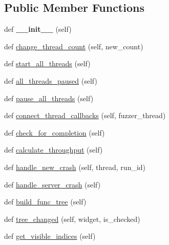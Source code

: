\subsection*{Public Member Functions}
\begin{DoxyCompactItemize}
\item 
\mbox{\label{classgui_1_1_main_window_a0d241e19e7e63710fec91439c752fd42}} 
def {\bfseries \+\_\+\+\_\+init\+\_\+\+\_\+} (self)
\item 
def \mbox{\hyperlink{classgui_1_1_main_window_a14e3103f94dde6b77a4a0b9303a0cd38}{change\+\_\+thread\+\_\+count}} (self, new\+\_\+count)
\item 
def \mbox{\hyperlink{classgui_1_1_main_window_a96d022201d286c60c202468c29379170}{start\+\_\+all\+\_\+threads}} (self)
\item 
def \mbox{\hyperlink{classgui_1_1_main_window_a9f26239fc8bef6253e4e08e16dd4d69b}{all\+\_\+threads\+\_\+paused}} (self)
\item 
def \mbox{\hyperlink{classgui_1_1_main_window_a09e1320955909d0a987d7846fa81107f}{pause\+\_\+all\+\_\+threads}} (self)
\item 
def \mbox{\hyperlink{classgui_1_1_main_window_ac32907b66ef6292c1b6e5f26d4a6baeb}{connect\+\_\+thread\+\_\+callbacks}} (self, fuzzer\+\_\+thread)
\item 
def \mbox{\hyperlink{classgui_1_1_main_window_aaad8f7c48ed82dc784928bb9ece116b3}{check\+\_\+for\+\_\+completion}} (self)
\item 
def \mbox{\hyperlink{classgui_1_1_main_window_a2a9cd1c91f12072f99ca7106b6345c0e}{calculate\+\_\+throughput}} (self)
\item 
def \mbox{\hyperlink{classgui_1_1_main_window_adc3e172325a2ce27f5e1068681690407}{handle\+\_\+new\+\_\+crash}} (self, thread, run\+\_\+id)
\item 
def \mbox{\hyperlink{classgui_1_1_main_window_a6ef7486d243e2ae8fa115a5f6ea6ee40}{handle\+\_\+server\+\_\+crash}} (self)
\item 
def \mbox{\hyperlink{classgui_1_1_main_window_a006abf132b0e9d55dbc3022d852ae856}{build\+\_\+func\+\_\+tree}} (self)
\item 
def \mbox{\hyperlink{classgui_1_1_main_window_a554202478b3e837e8db563acfa955012}{tree\+\_\+changed}} (self, widget, is\+\_\+checked)
\item 
def \mbox{\hyperlink{classgui_1_1_main_window_ac66feba1a2f8562a9e919bf2e9a7fdc1}{get\+\_\+visible\+\_\+indices}} (self)
\item 

\end{DoxyCompactItemize}
